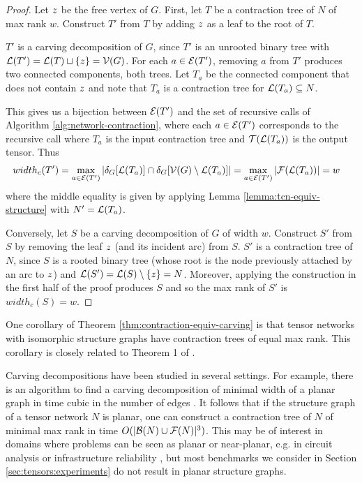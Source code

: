 \begin{proof}
Let $z$ be the free vertex of $G$. First, let $T$ be a contraction tree of $N$ of max rank $w$. Construct $T'$ from $T$ by adding $z$ as a leaf to the root of $T$. 

$T'$ is a carving decomposition of $G$, since $T'$ is an unrooted binary tree with $\mathcal{L}(T') = \mathcal{L}(T) \sqcup \{z\} = \mathcal{V}(G)$. 
For each $a \in \mathcal{E}(T')$, removing $a$ from $T'$ produces two connected components, both trees. Let $T_a$ be the connected component that does not contain $z$ and note that $T_a$ is a contraction tree for $\mathcal{L}(T_a) \subseteq N$. 

This gives us a bijection between $\mathcal{E}(T')$ and the set of recursive calls of Algorithm \ref{alg:network-contraction}, where each $a \in \mathcal{E}(T')$ corresponds to the recursive call where $T_a$ is the input contraction tree and $\mathcal{T}(\mathcal{L}(T_a))$ is the output tensor. Thus
\begin{align*}
&width_c(T') = \max_{a \in \mathcal{E}(T')} \left| \delta_{G}[\mathcal{L}(T_a)] \cap \delta_{G}[\mathcal{V}(G) \setminus \mathcal{L}(T_a)] \right| = \max_{a \in \mathcal{E}(T')} \left| \mathcal{F}(\mathcal{L}(T_a)) \right| = w
\end{align*}
where the middle equality is given by applying Lemma \ref{lemma:tcn-equiv-structure} with $N' = \mathcal{L}(T_a)$.

Conversely, let $S$ be a carving decomposition of $G$ of width $w$. Construct $S'$ from $S$ by removing the leaf $z$ (and its incident arc) from $S$. $S'$ is a contraction tree of $N$, since $S$ is a rooted binary tree (whose root is the node previously attached by an arc to $z$) and $\mathcal{L}(S') = \mathcal{L}(S) \setminus \{z\} = N$. Moreover, applying the construction in the first half of the proof produces $S$ and so the max rank of $S'$ is $width_c(S) = w$.
\end{proof}

One corollary of Theorem \ref{thm:contraction-equiv-carving} is that tensor networks with isomorphic structure graphs have contraction trees of equal max rank. This corollary is closely related to Theorem 1 of \cite{EP14}.

Carving decompositions have been studied in several settings. For example, there is an algorithm to find a carving decomposition of minimal width of a planar graph in time cubic in the number of edges \cite{GT08}. It follows that if the structure graph of a tensor network $N$ is planar, one can construct a contraction tree of $N$ of minimal max rank in time $O(|\mathcal{B}(N) \cup \mathcal{F}(N)|^3)$. This may be of interest in domains where problems can be seen as planar or near-planar, e.g. in circuit analysis or infrastructure reliability \cite{MS08,DLVR18}, but most benchmarks we consider in Section \ref{sec:tensors:experiments} do not result in planar structure graphs.


